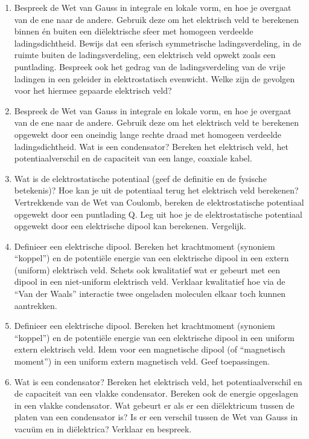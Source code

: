 \documentclass[12pt]{article}
\begin{document}
\begin{enumerate}
        \item Bespreek de Wet van Gauss in integrale en lokale vorm, en hoe je overgaat van de ene naar de andere. Gebruik deze om het elektrisch veld te berekenen binnen én buiten een diëlektrische sfeer met homogeen verdeelde ladingsdichtheid. Bewijs dat een sferisch symmetrische ladings­verdeling, in de ruimte buiten de ladingsverdeling, een elektrisch veld opwekt zoals een puntlading. Bespreek ook het gedrag van de ladingsverdeling van de vrije ladingen in een geleider in elektrostatisch evenwicht.  Welke zijn de gevolgen voor het hiermee gepaarde elektrisch veld?
        \item Bespreek de Wet van Gauss in integrale en lokale vorm, en hoe je overgaat van de ene naar de andere. Gebruik deze om het elektrisch veld te berekenen opgewekt door een oneindig lange rechte draad met homogeen verdeelde ladingsdichtheid. Wat is een condensator? Bereken het elektrisch veld, het potentiaalverschil en de capaciteit van een lange, coaxiale kabel.
        \item Wat is de elektrostatische potentiaal (geef de definitie en de fysische betekenis)? Hoe kan je uit de potentiaal terug het elektrisch veld berekenen? Vertrekken­de van de Wet van Coulomb, bereken de elektrostatische potentiaal opgewekt door een punt­lading Q. Leg uit hoe je de elektrostatische potentiaal opgewekt door een elektrische dipool kan berekenen. Vergelijk. 
        \item Definieer een elektrische dipool. Bereken het krachtmoment (synoniem “koppel”) en de potentiële energie van een elek­trische dipool in een extern (uniform) elektrisch veld. Schets ook kwalitatief wat er gebeurt met een dipool in een niet-uniform elektrisch veld. Verklaar kwalitatief hoe via de “Van der Waals” interactie twee ongeladen moleculen elkaar toch kunnen aantrekken.
        \item Definieer een elektrische dipool. Bereken het krachtmoment (synoniem “koppel”) en de potentiële energie van een elektrische dipool in een uniform extern elektrisch veld. Idem voor een magnetische dipool (of “magnetisch moment”) in een uniform extern magnetisch veld. Geef toepassingen.
        \item Wat is een condensator? Bereken het elektrisch veld, het potentiaalverschil en de capaciteit van een vlakke condensator. Bereken ook de energie opgeslagen in een vlakke condensator. Wat gebeurt er als er een diëlektricum tussen de platen van een condensator is? Is er een verschil tussen de Wet van Gauss in vacuüm en in diëlektrica? Verklaar en bespreek.

\end{enumerate}
\end{document}
